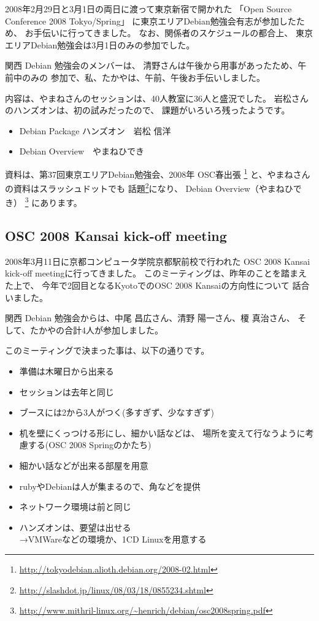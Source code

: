 \documentclass[mingoth,a4paper]{jsarticle}
\begin{document}
2008年2月29日と3月1日の両日に渡って東京新宿で開かれた
「Open Source Conference 2008 Tokyo/Spring」
に東京エリアDebian勉強会有志が参加したため、
お手伝いに行ってきました。
なお、関係者のスケジュールの都合上、
東京エリアDebian勉強会は3月1日のみの参加でした。

関西 Debian 勉強会のメンバーは、
清野さんは午後から用事があったため、午前中のみの
参加で、私、たかやは、午前、午後お手伝いしました。

内容は、やまねさんのセッションは、40人教室に36人と盛況でした。
岩松さんのハンズオンは、初の試みだったので、
課題がいろいろ残ったようです。

\begin{itemize}
 \item Debian Package ハンズオン　岩松 信洋
 \item Debian Overview　やまねひでき
\end{itemize}

\newpage

資料は、第37回東京エリアDebian勉強会、2008年 OSC春出張
\footnote{\url{http://tokyodebian.alioth.debian.org/2008-02.html}}
と、やまねさんの資料はスラッシュドットでも
話題\footnote{\url{http://slashdot.jp/linux/08/03/18/0855234.shtml}}になり、
Debian Overview（やまねひでき）
\footnote{\url{http://www.mithril-linux.org/~henrich/debian/osc2008spring.pdf}}
にあります。

\subsection{OSC 2008 Kansai kick-off meeting}
2008年3月11日に京都コンピュータ学院京都駅前校で行われた
OSC 2008 Kansai kick-off meetingに行ってきました。
このミーティングは、昨年のことを踏まえた上で、
今年で2回目となるKyotoでのOSC 2008 Kansaiの方向性について
話合いました。

関西 Debian 勉強会からは、中尾 昌広さん、清野 陽一さん、榎 真治さん、
そして、たかやの合計4人が参加しました。

このミーティングで決まった事は、以下の通りです。

\begin{itemize}
 \item 準備は木曜日から出来る
 \item セッションは去年と同じ
 \item ブースには2から3人がつく(多すぎず、少なすぎず)
 \item 机を壁にくっつける形にし、細かい話などは、
場所を変えて行なうように考慮する(OSC 2008 Springのかたち)
 \item 細かい話などが出来る部屋を用意
 \item rubyやDebianは人が集まるので、角などを提供
 \item ネットワーク環境は前と同じ
 \item ハンズオンは、要望は出せる\\
→VMWareなどの環境か、1CD Linuxを用意する
\end{itemize}
\end{document}
